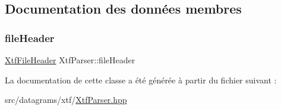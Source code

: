\subsection{Documentation des données membres}
\mbox{\label{classXtfParser_a6ae47b7023578a93dfecbf3035fd9918}} 
\subsubsection{\texorpdfstring{file\+Header}{fileHeader}}
{\footnotesize\ttfamily \hyperlink{structXtfFileHeader}{Xtf\+File\+Header} Xtf\+Parser\+::file\+Header\hspace{0.3cm}{\ttfamily [protected]}}



La documentation de cette classe a été générée à partir du fichier suivant \+:\begin{DoxyCompactItemize}
\item 
src/datagrams/xtf/\hyperlink{XtfParser_8hpp}{Xtf\+Parser.\+hpp}\end{DoxyCompactItemize}
